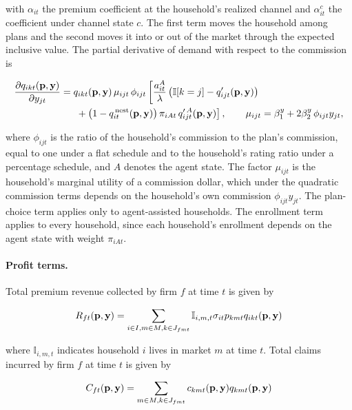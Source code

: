 \documentclass[12pt]{article}
\begin{document}
\noindent with $\alpha_{it}$ the premium coefficient at the household's realized channel and $\alpha^c_{it}$ the coefficient under channel state $c$. The first term moves the household among plans and the second moves it into or out of the market through the expected inclusive value. The partial derivative of demand with respect to the commission is

\begin{equation*}
	\begin{split}
		\frac{\partial q_{ikt}({\bf p},{\bf y})}{\partial  y_{jt}} = {} & q_{ikt}({\bf p},{\bf y})\, \mu_{ijt}\, \phi_{ijt} \left[ \frac{a^A_{it}}{\lambda}\left( \mathbb{I}[k = j] - q'_{ijt}({\bf p},{\bf y}) \right) \right. \\
		& \left. {} + \left(1 - q^{\,\mathrm{nest}}_{it}({\bf p},{\bf y})\right) \pi_{iAt}\, q'^{\,A}_{ijt}({\bf p},{\bf y}) \right], \qquad \mu_{ijt} = \beta^{y}_{1} + 2\beta^{y}_{2}\, \phi_{ijt} y_{jt},
	\end{split}
\end{equation*}

\noindent where $\phi_{ijt}$ is the ratio of the household's commission to the plan's commission, equal to one under a flat schedule and to the household's rating ratio under a percentage schedule, and $A$ denotes the agent state. The factor $\mu_{ijt}$ is the household's marginal utility of a commission dollar, which under the quadratic commission terms depends on the household's own commission $\phi_{ijt} y_{jt}$. The plan-choice term applies only to agent-assisted households. The enrollment term applies to every household, since each household's enrollment depends on the agent state with weight $\pi_{iAt}$.

\paragraph{Profit terms.}  Total premium revenue collected by firm $f$ at time $t$ is given by

\begin{equation*}
		R_{ft}({\bf p},{\bf y}) = \sum_{i \in I, m \in M, k \in J_{fmt}} \mathbb{I}_{i,m,t} \sigma_{it} p_{kmt} q_{ikt}({\bf p},{\bf y})
\end{equation*}

\noindent where $\mathbb{I}_{i,m,t}$ indicates household $i$ lives in market $m$ at time $t$.  Total claims incurred by firm $f$ at time $t$ is given by

\begin{equation*}
		C_{ft}({\bf p},{\bf y}) = \sum_{m \in M, k \in J_{fmt}}  c_{kmt}({\bf p},{\bf y}) q_{kmt}({\bf p},{\bf y})
\end{equation*}
\end{document}
